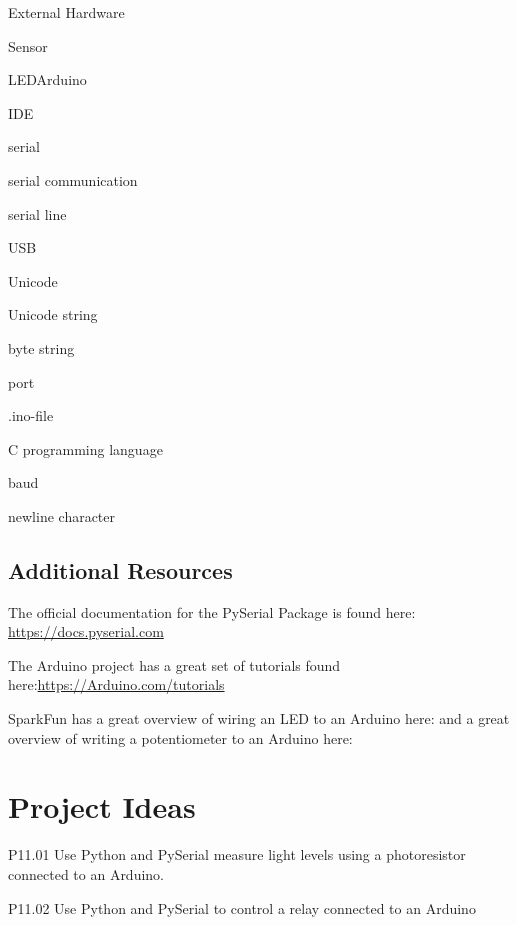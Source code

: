 \documentclass{book}
\newenvironment{key_terms}{\begin{multicols}{3}}{\end{multicols}} %
\begin{document}
    
        \begin{key_terms}
        External Hardware

Sensor

LEDArduino

IDE

serial

serial communication

serial line

USB

Unicode

Unicode string

byte string

port

.ino-file

C programming language

baud

newline character
        \end{key_terms}

    




    
        \hypertarget{additional-resources}{%
\subsection{Additional Resources}\label{additional-resources}}

The official documentation for the PySerial Package is found here:
\protect\hyperlink{}{https://docs.pyserial.com}

The Arduino project has a great set of tutorials found
here:\protect\hyperlink{}{https://Arduino.com/tutorials}

SparkFun has a great overview of wiring an LED to an Arduino here: and a
great overview of writing a potentiometer to an Arduino here:
    




    
        \hypertarget{project-ideas}{%
\section{Project Ideas}\label{project-ideas}}
    




    
        P11.01 Use Python and PySerial measure light levels using a
photoresistor connected to an Arduino.

P11.02 Use Python and PySerial to control a relay connected to an
Arduino
\end{document}
